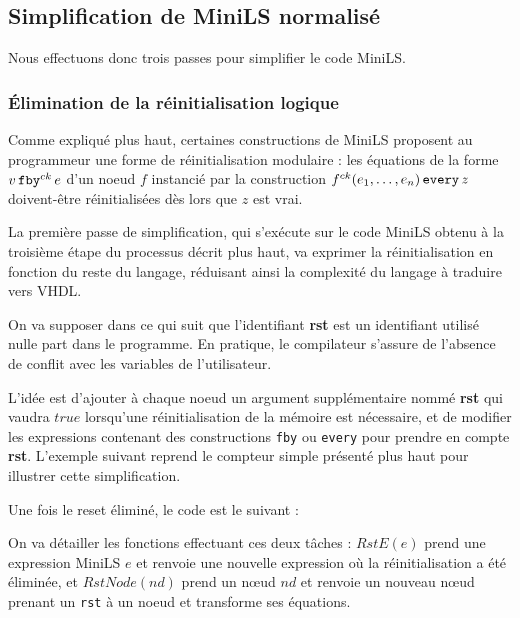 \documentclass[a4paper]{article}
\newcommand{\minils}{{\sc MiniLS}}
\newcommand{\mybox}[1]{\mbox{\tt{#1}}}
\newcommand{\Fby}[2]{#1 \, \mybox{fby}^{ck} \, #2}
\newcommand{\Every}[4]{#1^{ck}(#2,\dots,#3) \, \mybox{every} \, #4}
\begin{document}
\subsection{Simplification de MiniLS normalis\'e}

Nous effectuons donc trois passes pour simplifier le code \minils.

\subsubsection{\'Elimination de la r\'einitialisation logique}

Comme expliqu\'e plus haut, certaines constructions de MiniLS proposent au
programmeur une forme de r\'einitialisation modulaire : les \'equations de la
forme $\Fby{v}{e}$ d'un noeud $f$ instanci\'e par la construction
$\Every{f}{e_1}{e_n}{z}$ doivent-\^etre r\'einitialis\'ees d\`es lors que $z$
est vrai.

La premi\`ere passe de simplification, qui s'ex\'ecute sur le code MiniLS obtenu
\`a la troisi\`eme \'etape du processus d\'ecrit plus haut, va exprimer la
r\'einitialisation en fonction du reste du langage, r\'eduisant ainsi la complexit\'e
du langage \`a traduire vers VHDL.

On va supposer dans ce qui suit que l'identifiant \textbf{rst} est un
identifiant utilis\'e nulle part dans le programme. En pratique, le compilateur
s'assure de l'absence de conflit avec les variables de l'utilisateur.

L'id\'ee est d'ajouter \`a chaque noeud un argument suppl\'ementaire nomm\'e
\textbf{rst} qui vaudra $true$ lorsqu'une r\'einitialisation de la m\'emoire est
n\'ecessaire, et de modifier les expressions contenant des constructions
\texttt{fby} ou \texttt{every} pour prendre en compte \textbf{rst}. L'exemple
suivant reprend le compteur simple pr\'esent\'e plus haut pour illustrer cette
simplification.



Une fois le reset \'elimin\'e, le code est le suivant :



On va d\'etailler les fonctions effectuant ces deux t\^aches : $RstE(e)$ prend une
expression MiniLS $e$ et renvoie une nouvelle expression o\`u la r\'einitialisation
a \'et\'e \'elimin\'ee, et $RstNode(nd)$ prend un nœud $nd$ et renvoie un nouveau nœud
prenant un \texttt{rst} \`a un noeud et transforme ses \'equations.

\newcommand{\re}[1]{RstE(#1)}
\newcommand{\rstn}[1]{RstNode(#1)}
\end{document}
